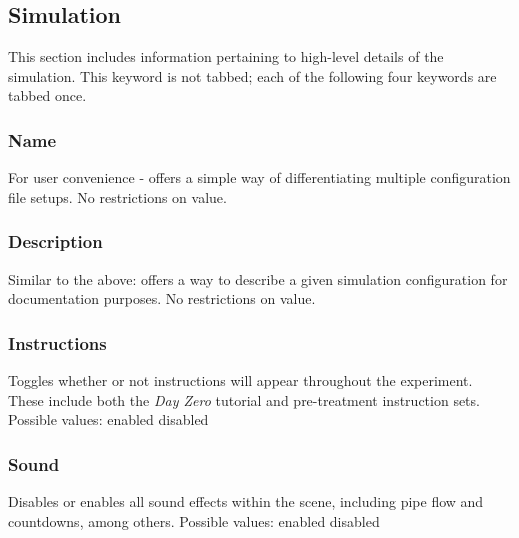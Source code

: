 \documentclass{article}
\begin{document}
\subsection{Simulation}
This section includes information pertaining to high-level details of the simulation. This keyword is not tabbed; each of the following four keywords are tabbed once.

\subsubsection{Name} For user convenience - offers a simple way of differentiating multiple configuration file setups. No restrictions on value. 

%

\subsubsection{Description} Similar to the above: offers a way to describe a given simulation configuration for documentation purposes. No restrictions on value. 

\subsubsection{Instructions} Toggles whether or not instructions will appear throughout the experiment. These include both the \textit{Day Zero} tutorial and pre-treatment instruction sets.
\newline \indent Possible values: \newline
\indent\indent enabled \newline
\indent\indent disabled

\subsubsection{Sound} Disables or enables all sound effects within the scene, including pipe flow and countdowns, among others.
\newline \indent Possible values: \newline
\indent\indent enabled \newline
\indent\indent disabled
\end{document}
